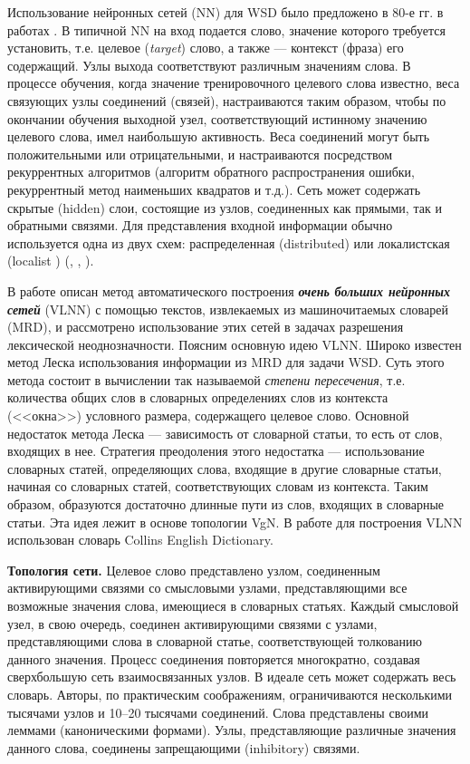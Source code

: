 \documentclass{article}
\begin{document}
\begin{articletext}
Использование нейронных сетей (NN)  для WSD было предложено в 80-е гг. в работах \cite{COTTRELL 1983,WALTZ 1985}. В типичной NN на вход   подается   слово, значение которого требуется установить, т.е. целевое (\textit{target}) слово, а также --- контекст (фраза) его содержащий. Узлы выхода соответствуют различным значениям слова. В процессе обучения, когда значение тренировочного целевого слова известно, веса связующих узлы соединений (связей), настраиваются таким образом, чтобы по окончании обучения выходной узел, соответствующий истинному значению целевого слова, имел наибольшую активность. Веса соединений могут быть  положительными или отрицательными, и настраиваются посредством рекуррентных алгоритмов (алгоритм обратного распространения ошибки,  рекуррентный метод наименьших квадратов и т.д.). Сеть может содержать скрытые (hidden) слои, состоящие из узлов, соединенных как прямыми, так и обратными связями. Для представления входной информации обычно используется одна из двух схем:  распределенная (distributed) или локалистская (localist ) (\cite{Hinton 1986}, \cite{COTTRELL 1989}, \cite{Azzini}). 

В работе \cite{VERONIS 1990} описан метод автоматического построения \textbf{\textit{очень больших нейронных сетей}} (VLNN) с помощью текстов, извлекаемых из машиночитаемых словарей (MRD), и рассмотрено использование этих сетей в задачах разрешения лексической неоднозначности. Поясним основную идею VLNN.  Широко известен метод Леска \cite{LESK 1986}  использования  информации  из MRD для  задачи  WSD.  Суть этого метода состоит в вычислении  так называемой \textit{степени пересечения}, т.е.  количества общих слов в словарных определениях слов из контекста (<<окна>>) условного размера, содержащего целевое слово. Основной недостаток метода Леска --- зависимость  от  словарной  статьи, то есть от слов, входящих в нее. Стратегия преодоления  этого  недостатка --- использование словарных статей, определяющих слова, входящие в другие словарные статьи, начиная со словарных статей, соответствующих  словам  из  контекста. Таким образом, образуются  достаточно  длинные   пути  из слов, входящих в словарные статьи. Эта  идея  лежит  в  основе  топологии VgN. В работе \cite{VERONIS 1990}  для построения  VLNN использован  словарь  Collins  English  Dictionary.

\textbf{Топология сети.} Целевое слово представлено  узлом, соединенным активирующими  связями со смысловыми узлами, представляющими все возможные значения слова, имеющиеся  в словарных статьях. Каждый смысловой узел, в свою очередь, соединен  активирующими  связями с узлами, представляющими  слова в словарной статье, соответствующей толкованию данного значения. Процесс соединения повторяется многократно, создавая сверхбольшую сеть взаимосвязанных узлов. В идеале сеть может содержать весь словарь. Авторы, по практическим соображениям, ограничиваются несколькими тысячами узлов и 10–20 тысячами соединений. Слова представлены своими леммами (каноническими формами). Узлы, представляющие различные значения данного слова, соединены запрещающими (inhibitory) связями.  


\end{articletext}
\end{document}
